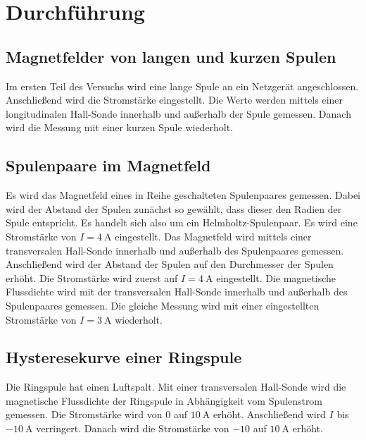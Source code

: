 \section{Durchführung}
\label{sec:Durchfuehrung}

\subsection{Magnetfelder von langen und kurzen Spulen}
Im ersten Teil des Versuchs wird eine lange Spule an ein Netzgerät angeschlossen. 
Anschließend wird die Stromstärke eingestellt.
Die Werte werden mittels einer longitudinalen Hall-Sonde innerhalb und außerhalb der
Spule gemessen. Danach wird die Messung mit einer kurzen Spule 
wiederholt. 

\subsection{Spulenpaare im Magnetfeld}
Es wird das Magnetfeld eines in Reihe geschalteten Spulenpaares gemessen. Dabei wird
der Abstand der Spulen zunächst so gewählt, dass dieser den Radien der Spule entspricht.
Es handelt sich also um ein Helmholtz-Spulenpaar. Es wird eine Stromstärke von
$I= \SI{4}{\ampere}$ eingestellt. Das Magnetfeld wird mittels einer 
transversalen Hall-Sonde innerhalb und außerhalb des Spulenpaares gemessen.
\newline
Anschließend wird der Abstand der Spulen auf den Durchmesser der Spulen erhöht.
Die Stromstärke wird zuerst auf $I= \SI{4}{\ampere}$ eingestellt.
Die magnetische Flussdichte wird mit der transversalen Hall-Sonde innerhalb und
außerhalb des Spulenpaares gemessen.
\newline
Die gleiche Messung wird mit einer eingestellten Stromstärke von
$I = \SI{3}{\ampere}$ wiederholt.

\subsection {Hysteresekurve einer Ringspule} 
Die Ringspule hat einen Luftspalt. Mit einer transversalen Hall-Sonde wird die 
magnetische Flussdichte der Ringspule in Abhängigkeit vom Spulenstrom gemessen.
Die Stromstärke wird von $\num{0}$ auf $\SI{10}{\ampere}$ erhöht.
Anschließend wird $I$ bis $\SI{-10}{\ampere}$ verringert. Danach wird die Stromstärke
von $\num{-10}$ auf $\SI{10}{\ampere}$ erhöht.


